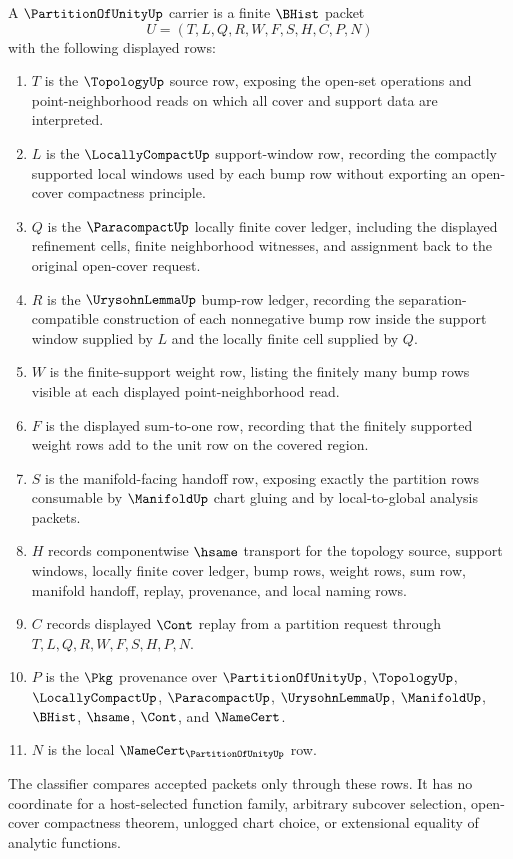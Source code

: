 \begin{definition}
\label{def:partition-of-unity-carrier}
A $\PartitionOfUnityUp$ carrier is a finite $\BHist$ packet
$$
U=(T,L,Q,R,W,F,S,H,C,P,N)
$$
with the following displayed rows:
\begin{enumerate}
\item $T$ is the $\TopologyUp$ source row, exposing the open-set operations and point-neighborhood reads on which all cover and support data are interpreted.
\item $L$ is the $\LocallyCompactUp$ support-window row, recording the compactly supported local windows used by each bump row without exporting an open-cover compactness principle.
\item $Q$ is the $\ParacompactUp$ locally finite cover ledger, including the displayed refinement cells, finite neighborhood witnesses, and assignment back to the original open-cover request.
\item $R$ is the $\UrysohnLemmaUp$ bump-row ledger, recording the separation-compatible construction of each nonnegative bump row inside the support window supplied by $L$ and the locally finite cell supplied by $Q$.
\item $W$ is the finite-support weight row, listing the finitely many bump rows visible at each displayed point-neighborhood read.
\item $F$ is the displayed sum-to-one row, recording that the finitely supported weight rows add to the unit row on the covered region.
\item $S$ is the manifold-facing handoff row, exposing exactly the partition rows consumable by $\ManifoldUp$ chart gluing and by local-to-global analysis packets.
\item $H$ records componentwise $\hsame$ transport for the topology source, support windows, locally finite cover ledger, bump rows, weight rows, sum row, manifold handoff, replay, provenance, and local naming rows.
\item $C$ records displayed $\Cont$ replay from a partition request through $T,L,Q,R,W,F,S,H,P,N$.
\item $P$ is the $\Pkg$ provenance over $\PartitionOfUnityUp$, $\TopologyUp$, $\LocallyCompactUp$, $\ParacompactUp$, $\UrysohnLemmaUp$, $\ManifoldUp$, $\BHist$, $\hsame$, $\Cont$, and $\NameCert$.
\item $N$ is the local $\NameCert_{\PartitionOfUnityUp}$ row.
\end{enumerate}
The classifier compares accepted packets only through these rows. It has no coordinate for a host-selected function family, arbitrary subcover selection, open-cover compactness theorem, unlogged chart choice, or extensional equality of analytic functions.
\end{definition}


